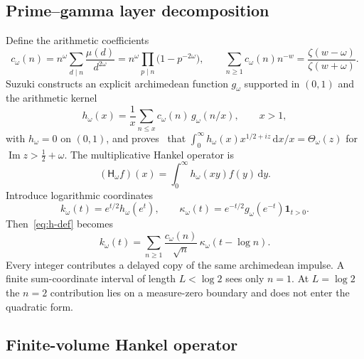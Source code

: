 \documentclass[11pt,a4paper]{article}
\renewcommand{\Im}{\operatorname{Im}}
\newcommand{\dd}{\,\mathrm d}
\newcommand{\Hsf}{\mathsf H}
\theoremstyle{plain}
\theoremstyle{definition}
\numberwithin{equation}{section}
\begin{document}
\subsection{Prime--gamma layer decomposition}

Define the arithmetic coefficients~\cite[eq.~(2.1)]{Suzuki2012}
\begin{equation}
c_\omega(n)=n^\omega\sum_{d\mid n}\frac{\mu(d)}{d^{2\omega}}
=n^\omega\prod_{p\mid n}\bigl(1-p^{-2\omega}\bigr),
\qquad
\sum_{n\ge1}c_\omega(n)n^{-w}=\frac{\zeta(w-\omega)}{\zeta(w+\omega)} .
\end{equation}
Suzuki constructs an explicit archimedean function $g_\omega$ supported in
$(0,1)$ and the arithmetic kernel~\cite[eq.~(2.3)]{Suzuki2012}
\begin{equation}\label{eq:h-def}
h_\omega(x)=\frac1x\sum_{n\le x}c_\omega(n)\,g_\omega(n/x),\qquad x>1,
\end{equation}
with $h_\omega=0$ on $(0,1)$, and proves~\cite[Prop.~2.1]{Suzuki2012} that
$\int_0^\infty h_\omega(x)x^{1/2+iz}\dd x/x=\Theta_\omega(z)$ for
$\Im z>\tfrac12+\omega$. The multiplicative Hankel operator
is~\cite[eq.~(2.5)]{Suzuki2012}
\begin{equation}
(\Hsf_\omega f)(x)=\int_0^\infty h_\omega(xy)f(y)\dd y .
\end{equation}
Introduce logarithmic coordinates
\begin{equation}
k_\omega(t)=e^{t/2}h_\omega(e^{t}),\qquad
\kappa_\omega(t)=e^{-t/2}g_\omega(e^{-t})\mathbf 1_{t>0}.
\end{equation}
Then~\eqref{eq:h-def} becomes
\begin{equation}\label{eq:layer}
k_\omega(t)=\sum_{n\ge1}\frac{c_\omega(n)}{\sqrt n}\,\kappa_\omega(t-\log n).
\end{equation}
Every integer contributes a delayed copy of the same archimedean impulse. A
finite sum-coordinate interval of length $L<\log2$ sees only $n=1$. At
$L=\log2$ the $n=2$ contribution lies on a measure-zero boundary and does not
enter the quadratic form.

\subsection{Finite-volume Hankel operator}
\end{document}
